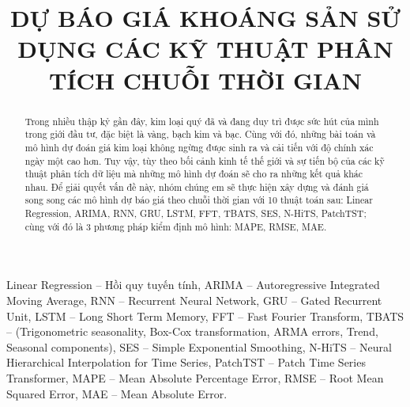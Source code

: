 \documentclass[conference]{IEEEtran}
\begin{document}
\title{DỰ BÁO GIÁ KHOÁNG SẢN SỬ DỤNG CÁC KỸ THUẬT PHÂN TÍCH CHUỖI THỜI GIAN \\

}

\author{
}

\maketitle

\begin{abstract}
Trong nhiều thập kỷ gần đây, kim loại quý đã và đang duy trì được sức hút của mình trong giới đầu tư, đặc biệt là vàng, bạch kim và bạc. Cùng với đó, những bài toán và mô hình dự đoán giá kim loại không ngừng được sinh ra và cải tiến với độ chính xác ngày một cao hơn. Tuy vậy, tùy theo bối cảnh kinh tế thế giới và sự tiến bộ của các kỹ thuật phân tích dữ liệu mà những mô hình dự đoán sẽ cho ra những kết quả khác nhau. Để giải quyết vấn đề này, nhóm chúng em sẽ thực hiện xây dựng và đánh giá song song các mô hình dự báo giá theo chuỗi thời gian với 10 thuật toán sau: Linear Regression, ARIMA, RNN, GRU, LSTM, FFT, TBATS, SES, N-HiTS, PatchTST; cùng với đó là 3 phương pháp kiểm định mô hình: MAPE, RMSE, MAE.
\end{abstract}

\begin{IEEEkeywords}
Linear Regression – Hồi quy tuyến tính, ARIMA – Autoregressive Integrated Moving Average, RNN – Recurrent Neural Network, GRU – Gated Recurrent Unit, LSTM – Long Short Term Memory, FFT – Fast Fourier Transform, TBATS – (Trigonometric seasonality, Box-Cox transformation, ARMA errors, Trend, Seasonal components), SES – Simple Exponential Smoothing, N-HiTS – Neural Hierarchical Interpolation for Time Series, PatchTST – Patch Time Series Transformer, MAPE – Mean Absolute Percentage Error, RMSE – Root Mean Squared Error, MAE – Mean Absolute Error.
\end{IEEEkeywords}
\end{document}
